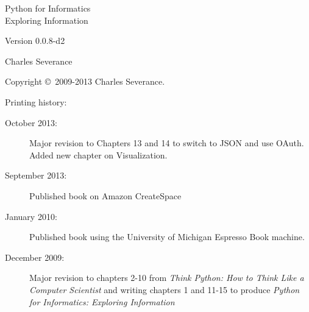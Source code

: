 \documentclass[11pt]{book}
\newcommand{\theversion}{0.0.8-d2}
\begin{document}
\frontmatter




\newtheorem{ex}{Exercise}[chapter]

\begin{latexonly}

\renewcommand{\blankpage}{\thispagestyle{empty} \quad \newpage}

\thispagestyle{empty}

\begin{flushright}
\vspace*{2.0in}

\begin{spacing}{3}
{\huge Python for Informatics}\\
{\Large Exploring Information}
\end{spacing}

\vspace{0.25in}

Version \theversion

\vspace{0.5in}


{\Large
Charles Severance\\
}

\vfill

\end{flushright}

\pagebreak
\thispagestyle{empty}

{\small
Copyright \copyright ~2009-2013 Charles Severance.


Printing history:

\begin{description}

\item[October 2013:] Major revision to Chapters 13 and 14
to switch to JSON and use OAuth.
Added new chapter on Visualization.

\item[September 2013:] Published book on Amazon CreateSpace

\item[January 2010:] Published book using the University of 
Michigan Espresso Book machine.

\item[December 2009:] Major revision to chapters 2-10 from
\emph{Think Python: How to Think Like
a Computer Scientist}
and writing chapters 1 and 11-15 to
produce 
\emph{Python for Informatics: Exploring Information}


\end{description}}
\end{latexonly}
\end{document}
